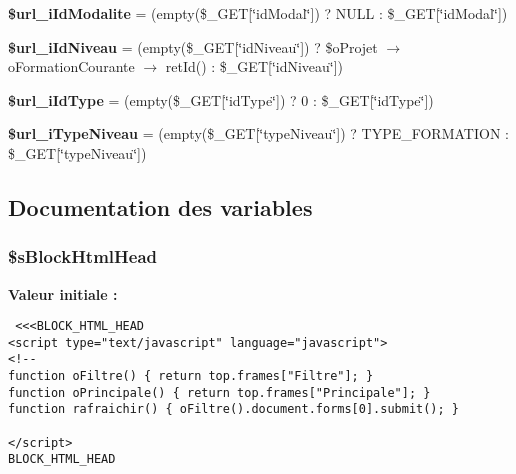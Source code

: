 \begin{CompactItemize}
\item 
\textbf{\$url\_\-iIdModalite} = (empty(\$\_\-GET[\char`\"{}idModal\char`\"{}]) ? NULL : \$\_\-GET[\char`\"{}idModal\char`\"{}])\label{tableau__bord-index_8php_2edc95399ae9c2596483c664df65e666}

\item 
\textbf{\$url\_\-iIdNiveau} = (empty(\$\_\-GET[\char`\"{}idNiveau\char`\"{}]) ? \$oProjet $\rightarrow$ oFormationCourante $\rightarrow$ retId() : \$\_\-GET[\char`\"{}idNiveau\char`\"{}])\label{tableau__bord-index_8php_14f74b59a1171eaf2411d94c3c8bf8dd}

\item 
\textbf{\$url\_\-iIdType} = (empty(\$\_\-GET[\char`\"{}idType\char`\"{}]) ? 0 : \$\_\-GET[\char`\"{}idType\char`\"{}])\label{tableau__bord-index_8php_7fea7f5b9f2fcee65976df1093b911aa}

\item 
\textbf{\$url\_\-iTypeNiveau} = (empty(\$\_\-GET[\char`\"{}typeNiveau\char`\"{}]) ? TYPE\_\-FORMATION : \$\_\-GET[\char`\"{}typeNiveau\char`\"{}])\label{tableau__bord-index_8php_526ed781c4213d7b78e267d1eeb0b7e4}

\end{CompactItemize}


\subsection{Documentation des variables}
\subsubsection{\setlength{\rightskip}{0pt plus 5cm}\$sBlockHtmlHead}\label{tableau__bord-index_8php_bd9cfe63e954bd2db0a26ee7f01c3ec3}


\textbf{Valeur initiale :}

\begin{Code}\begin{verbatim} <<<BLOCK_HTML_HEAD
<script type="text/javascript" language="javascript">
<!--
function oFiltre() { return top.frames["Filtre"]; }
function oPrincipale() { return top.frames["Principale"]; }
function rafraichir() { oFiltre().document.forms[0].submit(); }

</script>
BLOCK_HTML_HEAD
\end{verbatim}
\end{Code}
